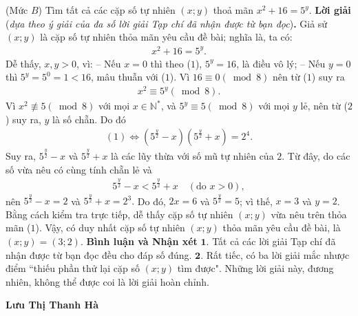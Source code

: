 \begin{multicols}{2}
	{}
	(Mức $B$) Tìm tất cả các cặp số tự nhiên $(x;y)$ thoả mãn $x^2+16=5^y$. 
	\vskip 0.05cm
	\textbf{\color{thachthuctoanhoc}Lời giải} (\textit{dựa theo ý giải của đa số lời giải Tạp chí đã nhận được từ bạn đọc})\textbf{\color{thachthuctoanhoc}.}
	\vskip 0.05cm
	Giả sử $(x; y)$ là cặp số tự nhiên thỏa mãn yêu cầu đề bài; nghĩa là, ta có:
	\begin{align*}
		{x^2} + 16 = {5^y}. \tag{$1$}
	\end{align*}
	Dễ thấy, $x, y > 0$, vì:
	\vskip 0.05cm
	-- Nếu $x = 0$ thì theo ($1$), $5^y= 16$, là điều vô lý;
	\vskip 0.05cm
	-- Nếu $y = 0$ thì $5^y = 5^0 = 1 < 16$, mâu thuẫn với ($1$).
	\vskip 0.05cm
	Vì  $16 \equiv 0\left( {\bmod 8} \right)$ nên từ ($1$) suy ra 
	\begin{align*}
		{x^2} \equiv {5^y}\left( {\bmod 8} \right). \tag{$2$}
	\end{align*}
	Vì ${x^2}\not  \equiv 5\left( {\bmod 8} \right)$  với mọi $x \in \mathbb{N^*}$,   và  ${5^y} \equiv 5\left( {\bmod 8} \right)$ với mọi $y$ lẻ, nên từ ($2$) suy ra, $y$ là số chẵn. Do đó
	\begin{align*}
		(1) \Leftrightarrow \left( {{5^{\frac{y}{2}}} - x} \right)\!\!\left( {{5^{\frac{y}{2}}} + x} \right) = {2^4}.
	\end{align*}
	Suy ra, ${5^{\frac{y}{2}}} - x$  và ${5^{\frac{y}{2}}} + x$  là các lũy thừa với số mũ tự nhiên của $2$. Từ đây, do các số vừa nêu có cùng tính chẵn lẻ và
	\begin{align*}
		{5^{\frac{y}{2}}} - x < {5^{\frac{y}{2}}} + x \quad(\text{do } x > 0),
	\end{align*}
	nên ${5^{\frac{y}{2}}} - x = 2$  và ${5^{\frac{y}{2}}} + x = {2^3}.$  Do đó, \linebreak $2x = 6$ và ${5^{\frac{y}{2}}} = 5$; vì thế, $x = 3$ và $y = 2$.
	\vskip 0.05cm
	Bằng cách kiểm tra trực tiếp, dễ thấy cặp số tự nhiên $(x; y)$ vừa nêu trên thỏa mãn ($1$).
	\vskip 0.05cm
	Vậy, có duy nhất cặp số tự nhiên $(x; y)$ thỏa mãn yêu cầu đề bài, là $(x; y) = (3; 2)$.
	\vskip 0.05cm
	\textbf{\color{thachthuctoanhoc}Bình luận và Nhận xét}
	\vskip 0.05cm
	$\pmb{1.}$ Tất cả các lời giải Tạp chí đã nhận được từ bạn đọc đều cho đáp số đúng.
	\vskip 0.05cm
	$\pmb{2.}$ Rất tiếc, có ba lời giải mắc nhược điểm ``thiếu phần thử lại cặp số $(x; y)$ tìm được". Những lời giải này, đương nhiên, không thể được coi là lời giải hoàn chỉnh.
	\begin{flushright}
		\textbf{\color{thachthuctoanhoc}Lưu Thị Thanh Hà}
	\end{flushright}

\end{multicols}
